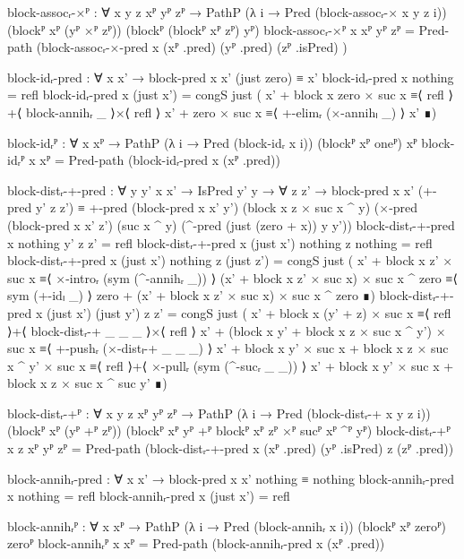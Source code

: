 \begin{code}[hide]
  block-assocᵣ-×ᴾ :
    ∀ {x y z} xᴾ yᴾ zᴾ →
    PathP (λ i → Pred (block-assocᵣ-× x y z i))
      (blockᴾ xᴾ (yᴾ ×ᴾ zᴾ)) (blockᴾ (blockᴾ xᴾ zᴾ) yᴾ)
  block-assocᵣ-×ᴾ {x} xᴾ yᴾ zᴾ =
    Pred-path (block-assocᵣ-×-pred x (xᴾ .pred) (yᴾ .pred) (zᴾ .isPred) )

  block-idᵣ-pred : ∀ x x' → block-pred x x' (just zero) ≡ x'
  block-idᵣ-pred x nothing = refl
  block-idᵣ-pred x (just x') =
    congS just
      ( x' + block x zero × suc x ≡⟨ refl ⟩+⟨ block-annihᵣ _ ⟩×⟨ refl ⟩
        x' + zero × suc x         ≡⟨ +-elimᵣ (×-annihₗ _) ⟩
        x'                        ∎)

  block-idᵣᴾ : ∀ {x} xᴾ → PathP (λ i → Pred (block-idᵣ x i)) (blockᴾ xᴾ oneᴾ) xᴾ
  block-idᵣᴾ {x} xᴾ = Pred-path (block-idᵣ-pred x (xᴾ .pred))

  block-distᵣ-+-pred :
    ∀ {y y'} x x' → IsPred y' y → ∀ z z' →
    block-pred x x' (+-pred y' z z') ≡
    +-pred
      (block-pred x x' y')
      (block x z × suc x ^ y)
      (×-pred
        (block-pred x x' z')
        (suc x ^ y)
        (^-pred (just (zero + x)) y y'))
  block-distᵣ-+-pred x nothing y' z z' = refl
  block-distᵣ-+-pred x (just x') nothing z nothing = refl
  block-distᵣ-+-pred x (just x') nothing z (just z') =
    congS just
      ( x' + block x z' × suc x                         ≡⟨ ×-introᵣ (sym (^-annihᵣ _)) ⟩
        (x' + block x z' × suc x) × suc x ^ zero        ≡⟨ sym (+-idₗ _) ⟩
        zero + (x' + block x z' × suc x) × suc x ^ zero ∎)
  block-distᵣ-+-pred x (just x') (just y') z z' =
    congS just
      ( x' + block x (y' + z) × suc x                             ≡⟨ refl ⟩+⟨ block-distᵣ-+ _ _ _ ⟩×⟨ refl ⟩
        x' + (block x y' + block x z × suc x ^ y') × suc x       ≡⟨ +-pushᵣ (×-distₗ-+ _ _ _) ⟩
        x' + block x y' × suc x + block x z × suc x ^ y' × suc x ≡⟨ refl ⟩+⟨ ×-pullᵣ (sym (^-sucᵣ _ _)) ⟩
        x' + block x y' × suc x + block x z × suc x ^ suc y'     ∎)

  block-distᵣ-+ᴾ :
    ∀ {x y z} xᴾ yᴾ zᴾ →
    PathP (λ i → Pred (block-distᵣ-+ x y z i))
      (blockᴾ xᴾ (yᴾ +ᴾ zᴾ)) (blockᴾ xᴾ yᴾ +ᴾ blockᴾ xᴾ zᴾ ×ᴾ sucᴾ xᴾ ^ᴾ yᴾ)
  block-distᵣ-+ᴾ {x} {z} xᴾ yᴾ zᴾ =
    Pred-path (block-distᵣ-+-pred x (xᴾ .pred) (yᴾ .isPred) z (zᴾ .pred))

  block-annihᵣ-pred : ∀ x x' → block-pred x x' nothing ≡ nothing
  block-annihᵣ-pred x nothing = refl
  block-annihᵣ-pred x (just x') = refl

  block-annihᵣᴾ :
    ∀ {x} xᴾ → PathP (λ i → Pred (block-annihᵣ x i)) (blockᴾ xᴾ zeroᴾ) zeroᴾ
  block-annihᵣᴾ {x} xᴾ = Pred-path (block-annihᵣ-pred x (xᴾ .pred))


\end{code}
